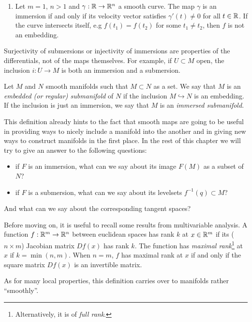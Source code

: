 \begin{example}
\begin{enumerate}
    \item Let $m=1$, $n > 1$ and $\gamma:\mathbb{R}\to\mathbb{R}^n$ a smooth curve.
          The map $\gamma$ is an immersion if and only if its velocity vector satisfies $\gamma'(t)\neq0$ for all $t\in\mathbb{R}$.
          If the curve intersects itself, e.g $f(t_1) = f(t_2)$ for some $t_1\neq t_2$, then $f$ is not an embedding.
  \end{enumerate}
\end{example}

\begin{remark}
  Surjectivity of submersions or injectivity of immersions are properties of the differentials, not of the maps themselves.
  For example, if $U\subset M$ open, the inclusion $i: U \to M$ is both an immersion and a submersion.
\end{remark}

\begin{definition}
  Let $M$ and $N$ smooth manifolds such that $M\subset N$ as a set.
  We say that $M$ is an \emph{embedded (or regular) submanifold} of $N$ if the inclusion $M\hookrightarrow N$ is an embedding. If the inclusion is just an immersion, we say that $M$ is an \emph{immersed submanifold}.
\end{definition}

This definition already hints to the fact that smooth maps are going to be useful in providing ways to nicely include a manifold into the another and in giving new ways to construct manifolds in the first place.
In the rest of this chapter we will try to give an answer to the following questions:
\begin{itemize}
  \item if $F$ is an immersion, what can we say about its image $F(M)$ as a subset of $N$?
  \item if $F$ is a submersion, what can we say about its levelsets $f^{-1}(q) \subset M$?
\end{itemize}
And what can we say about the corresponding tangent spaces?

Before moving on, it is useful to recall some results from multivariable analysis.
A function $f:\mathbb{R}^m \to \mathbb{R}^n$ between euclidean spaces has rank $k$ at $x\in\mathbb{R}^m$ if its ($n\times m$) Jacobian matrix $Df(x)$ has rank $k$.
The function has \emph{maximal rank}\footnote{Alternatively, it is of \emph{full rank}.} at $x$ if $k = \min(n,m)$.
When $n=m$, $f$ has maximal rank at $x$ if and only if the square matrix $Df(x)$ is an invertible matrix.

As for many local properties, this definition carries over to manifolds rather ``smoothly''.

